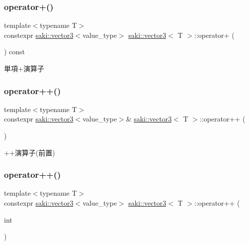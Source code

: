 \subsubsection{\texorpdfstring{operator+()}{operator+()}}
{\footnotesize\ttfamily template$<$typename T$>$ \\
constexpr \mbox{\hyperlink{classsaki_1_1vector3}{saki\+::vector3}}$<$value\+\_\+type$>$ \mbox{\hyperlink{classsaki_1_1vector3}{saki\+::vector3}}$<$ T $>$\+::operator+ (\begin{DoxyParamCaption}{ }\end{DoxyParamCaption}) const\hspace{0.3cm}{\ttfamily [inline]}}



単項+演算子 

\mbox{\label{classsaki_1_1vector3_afa127eca73c7de76a82bb158e78c1d70}} 
\subsubsection{\texorpdfstring{operator++()}{operator++()}\hspace{0.1cm}{\footnotesize\ttfamily [1/2]}}
{\footnotesize\ttfamily template$<$typename T$>$ \\
constexpr \mbox{\hyperlink{classsaki_1_1vector3}{saki\+::vector3}}$<$value\+\_\+type$>$\& \mbox{\hyperlink{classsaki_1_1vector3}{saki\+::vector3}}$<$ T $>$\+::operator++ (\begin{DoxyParamCaption}{ }\end{DoxyParamCaption})\hspace{0.3cm}{\ttfamily [inline]}}



++演算子(前置) 

\mbox{\label{classsaki_1_1vector3_a2310ac18d9b37a8ab6d967bfd9720998}} 
\subsubsection{\texorpdfstring{operator++()}{operator++()}\hspace{0.1cm}{\footnotesize\ttfamily [2/2]}}
{\footnotesize\ttfamily template$<$typename T$>$ \\
constexpr \mbox{\hyperlink{classsaki_1_1vector3}{saki\+::vector3}}$<$value\+\_\+type$>$ \mbox{\hyperlink{classsaki_1_1vector3}{saki\+::vector3}}$<$ T $>$\+::operator++ (\begin{DoxyParamCaption}\item[{int}]{ }\end{DoxyParamCaption})\hspace{0.3cm}{\ttfamily [inline]}}



